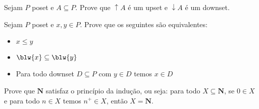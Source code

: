 \begin{exercise}

	Sejam $P$ poset e $A \subseteq P$. Prove que $\uparrow A$ é um upset e $\downarrow A$ é um downset.
\end{exercise}

\begin{exercise}

	Sejam $P$ poset e $x, y \in P$. Prove que os seguintes são equivalentes:
	\begin{itemize}
		\item $x \leq y$
		\item $\blw{x} \subseteq \blw{y}$
		\item Para todo downset $D \subseteq P$ com $y \in D$ temos $x \in D$
	\end{itemize}
\end{exercise}

\begin{exercise}

	Prove que $\mathbf{N}$ satisfaz o princípio da indução, ou seja:
	para todo $X \subseteq \mathbf{N}$, se $0 \in X$ e para todo $n \in X$ temos $n^+ \in X$, então $X = \mathbf{N}$.
\end{exercise}
